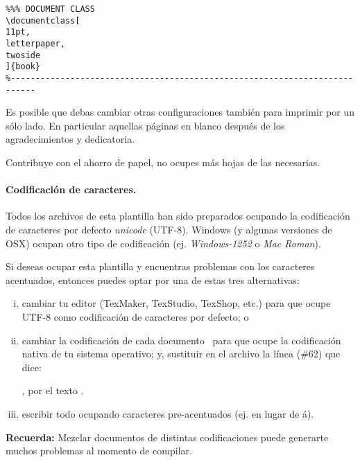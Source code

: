 \begin{Verbatim}[frame=lines, label=\inlinecode{memoria.tex} (extracto)
, fontsize=\footnotesize
, baselinestretch=1
, formatcom=\color{gray}]
%---------------------------------------------------------------------------
%%% DOCUMENT CLASS
\documentclass[
11pt,
letterpaper,
twoside
]{book}
%---------------------------------------------------------------------------
\end{Verbatim}


Es posible que debas cambiar otras configuraciones también para imprimir por un sólo lado. En particular aquellas páginas en blanco después de los agradecimientos y dedicatoria.

Contribuye con el ahorro de papel, no ocupes más hojas de las necesarias.

\paragraph{Codificación de caracteres.}

Todos los archivos  de esta plantilla han sido preparados ocupando la codificación de caracteres por defecto \emph{unicode} (UTF-8). Windows (y algunas versiones de OSX) ocupan otro tipo de codificación (ej. \emph{Windows-1252} o \emph{Mac Roman}).

Si deseas ocupar esta plantilla y encuentras problemas con los caracteres acentuados, entonces puedes optar por una de estas tres alternativas:
\begin{enumerate}[i)]
    \item cambiar tu editor (TexMaker, TexStudio, TexShop, etc.) para que ocupe UTF-8 como codificación de caracteres por defecto; o
    \item cambiar la codificación de cada documento  para que ocupe la codificación nativa de tu sistema operativo; y, sustituir en el archivo  la línea (\#62) que dice:
    
    , por el texto .
    \item escribir todo ocupando caracteres pre-acentuados (ej.  en lugar de á).
\end{enumerate}

\begin{framed}
    \textbf{Recuerda:} Mezclar documentos de distintas codificaciones puede generarte muchos problemas al momento de compilar.  
\end{framed}

